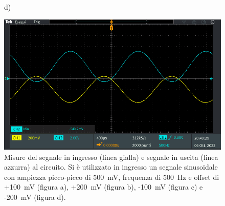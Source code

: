 \begin{figure}[h]
	\centering
	d)
	
	\includegraphics[width=0.8\linewidth]{./ImageFiles/Laboratorio 1/TEK00015}
	\caption{Misure del segnale in ingresso (linea gialla) e segnale in uscita (linea azzurra) al circuito. Si è utilizzato in ingresso un segnale sinusoidale con ampiezza picco-picco di \SI{500}{\milli\volt}, frequenza di \SI{500}{\hertz} e offset di +\SI{100}{\milli\volt} (figura a), +\SI{200}{\milli\volt} (figura b), -\SI{100}{\milli\volt} (figura c) e -\SI{200}{\milli\volt} (figura d).}
	\label{fig:misure_oscilloscopio_offset}
\end{figure} 

